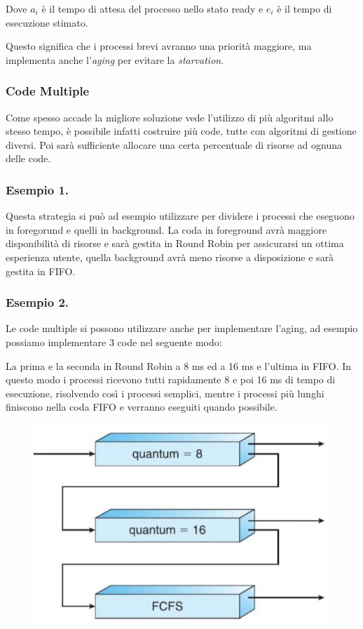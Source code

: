 Dove $a_i$ è il tempo di attesa del processo nello stato ready e $e_i$ è il tempo di esecuzione stimato.

\spacer
Questo significa che i processi brevi avranno una priorità maggiore, ma implementa anche l'\textit{aging} per evitare la \textit{starvation}.

\subsubsection{Code Multiple}
Come spesso accade la migliore soluzione vede l'utilizzo di più algoritmi allo stesso tempo, è possibile infatti costruire più code, tutte con algoritmi di gestione diversi. Poi sarà sufficiente allocare una certa percentuale di risorse ad ognuna delle code.

\subsubsection{Esempio 1.}
Questa strategia si può ad esempio utilizzare per dividere i processi che eseguono in foregorund e quelli in background. La coda in foreground avrà maggiore disponibilità di risorse e sarà gestita in Round Robin per assicurarsi un ottima esperienza utente, quella background avrà meno risorse a disposizione e sarà gestita in FIFO.

\subsubsection{Esempio 2.}
Le code multiple si possono utilizzare anche per implementare l'aging, ad esempio possiamo implementare 3 code nel seguente modo:

La prima e la seconda in Round Robin a 8 ms ed a 16 ms e l'ultima in FIFO.
In questo modo i processi ricevono tutti rapidamente 8 e poi 16 ms di tempo di esecuzione, risolvendo così i processi semplici, mentre i processi più lunghi finiscono nella coda FIFO e verranno eseguiti quando possibile.

\begin{figure}[H]
    \centering
    \includegraphics[width=0.32\linewidth]{assets/code-multiple.jpg}
\end{figure}

